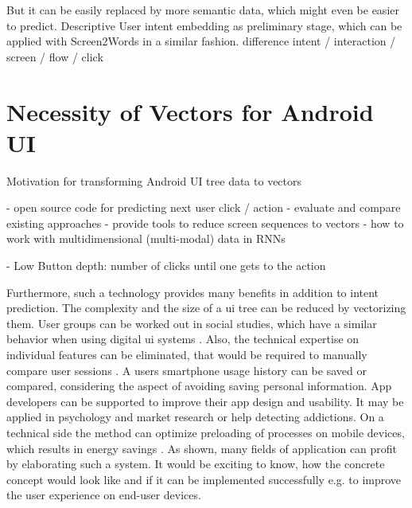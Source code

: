 
But it can be easily replaced by more semantic data, which might even be easier to predict.
Descriptive User intent embedding as preliminary stage, which can be applied with Screen2Words\cite{wang2021screen2words} in a similar fashion.
difference intent / interaction / screen / flow / click


\section{Necessity of Vectors for Android UI}
\label{sec:necessity-of-vectors-for-android-ui}


Motivation for transforming Android UI tree data to vectors

- open source code for predicting next user click / action
- evaluate and compare existing approaches
- provide tools to reduce screen sequences to vectors
- how to work with multidimensional (multi-modal) data in RNNs

- Low Button depth: number of clicks until one gets to the action \cite{lee2018click}


Furthermore, such a technology provides many benefits in addition to intent prediction.
The complexity and the size of a \gls{ui} tree can be reduced by vectorizing them. 
User groups can be worked out in social studies, which have a similar behavior when using digital \gls{ui} systems \cite{jayarajah2015need}.
Also, the technical expertise on individual features can be eliminated, that would be required to manually compare user sessions \cite{ghods2019activity2vec}.
A users smartphone usage history can be saved or compared, considering the aspect of avoiding saving personal information.
App developers can be supported to improve their app design and usability.
It may be applied in psychology and market research or help detecting addictions.
On a technical side the method can optimize preloading of processes on mobile devices, which results in energy savings \cite{shen2019deepapp}.
As shown, many fields of application can profit by elaborating such a system.
It would be exciting to know, how the concrete concept would look like and if it can be implemented successfully e.g. to improve the user experience on end-user devices.

